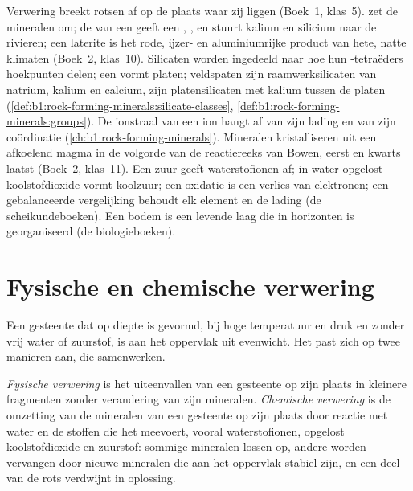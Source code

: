 \begin{recall}
Verwering breekt rotsen af op de plaats waar zij liggen (Boek~1, klas~5).  zet de mineralen om; de  van een  geeft een , , en stuurt kalium en silicium naar de rivieren; een laterite is het rode, ijzer- en aluminiumrijke product van hete, natte klimaten (Boek~2, klas~10). Silicaten worden ingedeeld naar hoe hun -tetraëders hoekpunten delen; een  vormt platen; veldspaten zijn raamwerksilicaten van natrium, kalium en calcium,  zijn platensilicaten met kalium tussen de platen (\cref{def:b1:rock-forming-minerals:silicate-classes}, \cref{def:b1:rock-forming-minerals:groups}). De ionstraal van een ion hangt af van zijn lading en van zijn coördinatie (\cref{ch:b1:rock-forming-minerals}). Mineralen kristalliseren uit een afkoelend magma in de volgorde van de reactiereeks van Bowen,  eerst en kwarts laatst (Boek~2, klas~11). Een zuur geeft waterstofionen af; in water opgelost koolstofdioxide vormt koolzuur; een oxidatie is een verlies van elektronen; een gebalanceerde vergelijking behoudt elk element en de lading (de scheikundeboeken). Een bodem is een levende laag die in horizonten is georganiseerd (de biologieboeken).
\end{recall}

\section{Fysische en chemische verwering}\label{sec:b1:weathering-clays:types}

Een gesteente dat op diepte is gevormd, bij hoge temperatuur en druk en zonder vrij water of zuurstof, is aan het oppervlak uit evenwicht. Het past zich op twee manieren aan, die samenwerken.

\begin{definition}\label{def:b1:weathering-clays:weathering}
\emph{Fysische verwering} is het uiteenvallen van een gesteente op zijn plaats in kleinere fragmenten zonder verandering van zijn mineralen. \emph{Chemische verwering} is de omzetting van de mineralen van een gesteente op zijn plaats door reactie met water en de stoffen die het meevoert, vooral waterstofionen, opgelost koolstofdioxide en zuurstof: sommige mineralen lossen op, andere worden vervangen door nieuwe mineralen die aan het oppervlak stabiel zijn, en een deel van de rots verdwijnt in oplossing.
\end{definition}

